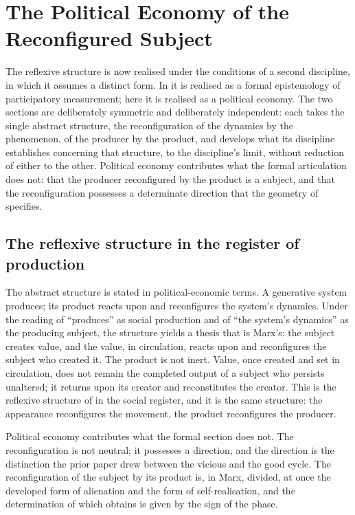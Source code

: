 \section{The Political Economy of the Reconfigured Subject}
\label{p10:sec:political}

\noindent
The reflexive structure is now realised under the conditions of a second discipline, in which it assumes a distinct form. In  it is realised as a formal epistemology of participatory measurement; here it is realised as a political economy. The two sections are deliberately symmetric and deliberately independent: each takes the single abstract structure, the reconfiguration of the dynamics by the phenomenon, of the producer by the product, and develops what its discipline establishes concerning that structure, to the discipline's limit, without reduction of either to the other. Political economy contributes what the formal articulation does not: that the producer reconfigured by the product is a subject, and that the reconfiguration possesses a determinate direction that the geometry of  specifies.

\subsection{The reflexive structure in the register of production}
\label{p10:sec:reflexive-production}

The abstract structure is stated in political-economic terms. A generative system produces; its product reacts upon and reconfigures the system's dynamics. Under the reading of ``produces'' as social production and of ``the system's dynamics'' as the producing subject, the structure yields a thesis that is Marx's: the subject creates value, and the value, in circulation, reacts upon and reconfigures the subject who created it. The product is not inert. Value, once created and set in circulation, does not remain the completed output of a subject who persists unaltered; it returns upon its creator and reconstitutes the creator. This is the reflexive structure of  in the social register, and it is the same structure: the appearance reconfigures the movement, the product reconfigures the producer.

Political economy contributes what the formal section does not. The reconfiguration is not neutral; it possesses a direction, and the direction is the distinction the prior paper drew between the vicious and the good cycle. The reconfiguration of the subject by its product is, in Marx, divided, at once the developed form of alienation and the form of self-realisation, and the determination of which obtains is given by the sign of the phase.


